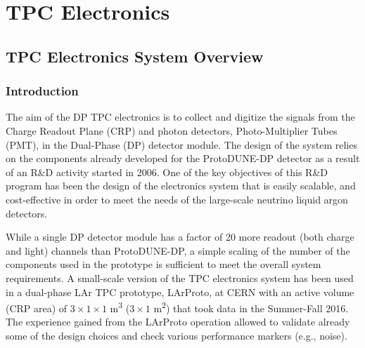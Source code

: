 \chapter{TPC Electronics}
\label{ch:fddp-tpc-elec}


\section{TPC Electronics System Overview}
\label{sec:fddp-tpc-elec-ov}

\subsection{Introduction}
\label{sec:fddp-tpc-elec-intro}

The aim of the DP TPC electronics is to collect and digitize the signals from the Charge Readout Plane (CRP) and photon detectors, Photo-Multiplier Tubes (PMT), in the Dual-Phase (DP) detector module. The design of the system relies on the components already developed for the ProtoDUNE-DP detector as a result of an R\&D activity started in 2006. One of the key objectives of this R\&D program has been the design of the electronics system that is easily scalable, and cost-effective in order to meet the needs of the large-scale neutrino liquid argon detectors.  

While a single DP detector module has a factor of \num{20} more readout (both charge and light) channels than ProtoDUNE-DP, a simple scaling of the number of the components used in the prototype is sufficient to meet the overall system requirements. A small-scale version of the TPC electronics system has been used in a dual-phase LAr TPC prototype, LArProto, at CERN with an active volume (CRP area) of $3\times 1 \times 1$ \si{\meter\cubed} ($3\times1$ \si{\meter\squared}) that took data in the Summer-Fall 2016. The experience gained from the LArProto operation allowed to validate already some of the design choices and check various performance markers (e.g., noise). 

